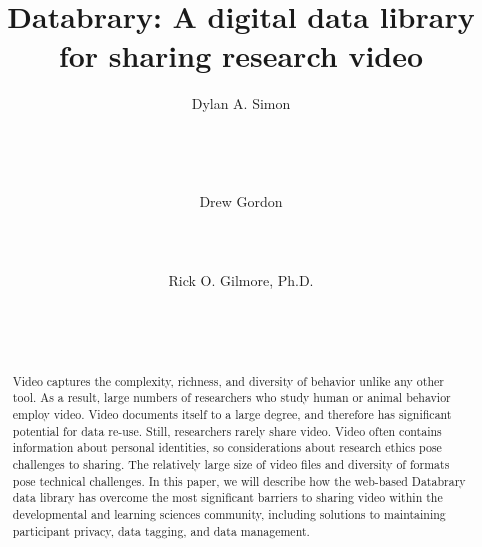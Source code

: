\documentclass{sig-alternate}
\begin{document}

\title{Databrary: A digital data library for sharing research video}


\author{
\alignauthor
Dylan A. Simon\\
	\\
	\\
	\\
	\\
\alignauthor
Drew Gordon\\
	\\
	\\
	\\
\alignauthor
Rick O. Gilmore, Ph.D.\\
	\\
	\\
	\\
}

\maketitle

\begin{abstract}

Video captures the complexity, richness, and diversity of behavior
unlike any other tool. As a result, large numbers of researchers who
study human or animal behavior employ video. Video documents itself to a
large degree, and therefore has significant potential for data re-use.
Still, researchers rarely share video. Video often contains information
about personal identities, so considerations about research ethics pose
challenges to sharing. The relatively large size of video files and
diversity of formats pose technical challenges. In this paper, we will
describe how the web-based Databrary data library has overcome the most
significant barriers to sharing video within the developmental and
learning sciences community, including solutions to maintaining
participant privacy, data tagging, and data management.
\end{abstract}
\end{document}
